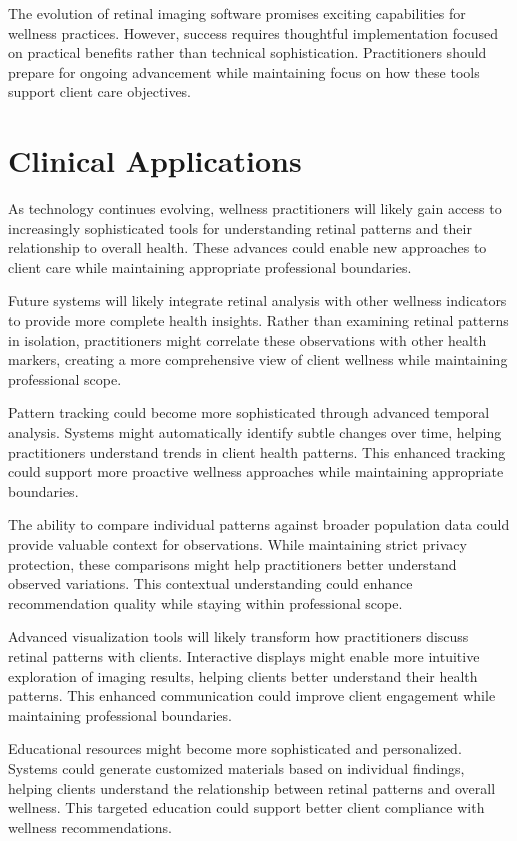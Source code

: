 \documentclass[
  Letterpaper,
]{scrbook}
\begin{document}
The evolution of retinal imaging software promises exciting capabilities
for wellness practices. However, success requires thoughtful
implementation focused on practical benefits rather than technical
sophistication. Practitioners should prepare for ongoing advancement
while maintaining focus on how these tools support client care
objectives.

\section{Clinical Applications}\label{clinical-applications}

As technology continues evolving, wellness practitioners will likely
gain access to increasingly sophisticated tools for understanding
retinal patterns and their relationship to overall health. These
advances could enable new approaches to client care while maintaining
appropriate professional boundaries.

Future systems will likely integrate retinal analysis with other
wellness indicators to provide more complete health insights. Rather
than examining retinal patterns in isolation, practitioners might
correlate these observations with other health markers, creating a more
comprehensive view of client wellness while maintaining professional
scope.

Pattern tracking could become more sophisticated through advanced
temporal analysis. Systems might automatically identify subtle changes
over time, helping practitioners understand trends in client health
patterns. This enhanced tracking could support more proactive wellness
approaches while maintaining appropriate boundaries.

The ability to compare individual patterns against broader population
data could provide valuable context for observations. While maintaining
strict privacy protection, these comparisons might help practitioners
better understand observed variations. This contextual understanding
could enhance recommendation quality while staying within professional
scope.

Advanced visualization tools will likely transform how practitioners
discuss retinal patterns with clients. Interactive displays might enable
more intuitive exploration of imaging results, helping clients better
understand their health patterns. This enhanced communication could
improve client engagement while maintaining professional boundaries.

Educational resources might become more sophisticated and personalized.
Systems could generate customized materials based on individual
findings, helping clients understand the relationship between retinal
patterns and overall wellness. This targeted education could support
better client compliance with wellness recommendations.
\end{document}
